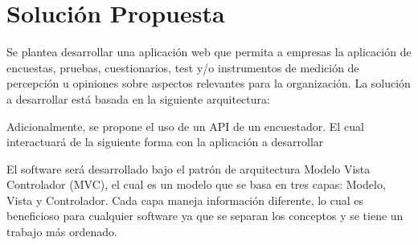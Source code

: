 \chapter{Solución Propuesta}
Se plantea desarrollar una aplicación web que permita a empresas la aplicación de encuestas, pruebas, cuestionarios, test y/o instrumentos de medición de percepción u opiniones sobre aspectos relevantes para la organización. La solución a desarrollar está basada en la siguiente arquitectura:



Adicionalmente, se propone el uso de un API de un encuestador. El cual interactuará de la siguiente forma con la aplicación a desarrollar


El software será desarrollado bajo el patrón de arquitectura Modelo Vista Controlador (MVC), el cual es un modelo que se basa en tres capas: Modelo, Vista y Controlador. Cada capa maneja información diferente, lo cual es beneficioso para cualquier software ya que se separan los conceptos y se tiene un trabajo más ordenado.

